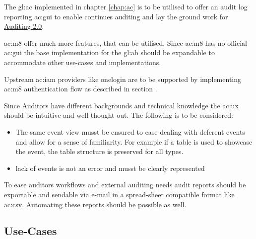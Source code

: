 

The \gls{gl:ac} implemented in chapter \ref{chap:ac} is to be utilised to offer an audit log reporting \gls{ac:gui} to enable continues auditing and lay the ground work for \hyperref[sec:adt2]{Auditing 2.0}.

\Gls{ac:m8} offer much more features, that can be utilised. Since \gls{ac:m8} has no official \gls{ac:gui} the base implementation for the \gls{gl:ab} should be expandable to accommodate other use-cases and implementations.

Upstream \gls{ac:iam} providers like onelogin are to be supported by implementing \gls{ac:m8} authentication flow as described in section .

Since Auditors have different backgrounds and technical knowledge the \gls{ac:ux} should be intuitive and well thought out. The following is to be considered:

\begin{itemize}
  \item The same event view musst be ensured to ease dealing with deferent events and allow for a sense of familiarity. For example if a table is used to showcase the event, the table structure is preserved for all types.
  \item lack of events is not an error and musst be clearly represented
\end{itemize}

To ease auditors workflows and external auditing needs audit reports should be exportable and sendable via e-mail in a spread-sheet compatible format like \gls{ac:csv}. Automating these reports should be possible as well. 

\subsection{Use-Cases}

